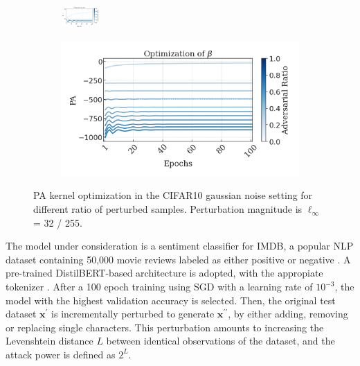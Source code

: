 \begin{figure}[t]
    \centering
    \begin{subfigure}[b]{0.49\textwidth}
        \centering
        \includegraphics[width=\textwidth]{img/results_discussion/empirical/beta_100.pdf}
    \end{subfigure}
    \hfill
    \begin{subfigure}[b]{0.49\textwidth}
        \centering
        \includegraphics[width=\textwidth]{img/results_discussion/empirical/logPA_100.png}
    \end{subfigure}
    \caption{PA kernel optimization in the CIFAR10 gaussian noise setting for different ratio
    of perturbed samples. Perturbation magnitude is $\ell_\infty$ = 32 / 255.}
    \label{fig:gaussian_optimization}
\end{figure}



\begin{experiment}
The model under consideration is a sentiment classifier for IMDB,
a popular NLP dataset containing 50,000 movie reviews labeled 
as either positive or negative
\cite{maas2011learning}. 
A pre-trained DistilBERT-based architecture 
is adopted, with the appropiate tokenizer
\cite{sanh2019distilbert}. 
After a 100 epoch training using SGD with a learning rate of $10^{-3}$, the model with the highest validation
accuracy is selected. Then, the original test dataset $\bm{x}^\prime$
is incrementally perturbed to generate $\bm{x}^{\prime \prime}$, by either adding, removing or replacing 
single characters. This perturbation amounts to increasing the Levenshtein
distance $L$ between identical observations of the dataset, and the attack power
is defined as $2^{L}$.
\end{experiment}

